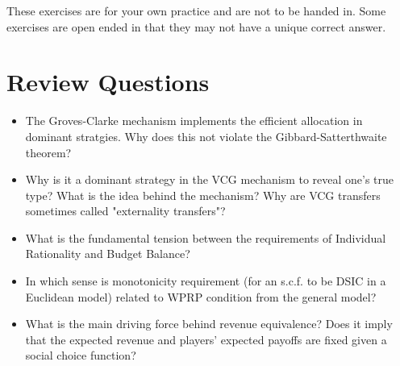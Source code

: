 \documentclass{article}
\newcommand{\enterProblemHeader}[1]{
\nobreak\extramarks{#1}{#1 continued on next page\ldots}\nobreak
\nobreak\extramarks{#1 (continued)}{#1 continued on next page\ldots}\nobreak
}
\newcommand{\exitProblemHeader}[1]{
\nobreak\extramarks{#1 (continued)}{#1 continued on next page\ldots}\nobreak
\nobreak\extramarks{#1}{}\nobreak
}
\newcounter{homeworkProblemCounter} %
\newcommand{\homeworkProblemName}{}
\newenvironment{ex}[1][Problem \arabic{homeworkProblemCounter}]{ %
\stepcounter{homeworkProblemCounter} %
\renewcommand{\homeworkProblemName}{#1} %
\section{\homeworkProblemName} %
}{
}
\newif\ifsolutions
\begin{document}
\ifsolutions
	\begin{center}

		{\Huge Problem Set for Lecture 2(b)
(with Solutions)}
	\end{center}

	\emph{The solutions below brought to you by Hannah Barth and Inga Reymann. Where necessary, I also present older solutions available to me (instead of or in addition to those by Hannah and Inga). Notes in cursive added by Egor.}
\fi

	
These exercises are for your own practice and are not to be handed in. Some exercises are open ended in that they may not have a unique correct answer.


\begin{ex}[Review Questions]
	\begin{itemize}
		\item The Groves-Clarke mechanism implements the efficient allocation in dominant stratgies. Why does this not violate the Gibbard-Satterthwaite theorem?
		\item Why is it a dominant strategy in the VCG mechanism to reveal one’s true type? What is the idea behind the mechanism? Why are VCG transfers sometimes called "externality transfers"?
		\item What is the fundamental tension between the requirements of Individual Rationality and Budget Balance?
		\item In which sense is monotonicity requirement (for an s.c.f. to be DSIC in a Euclidean model) related to WPRP condition from the general model?
		\item What is the main driving force behind revenue equivalence? Does it imply that the expected revenue and players' expected payoffs are fixed given a social choice function?
	\end{itemize}
\end{ex}



\end{document}
